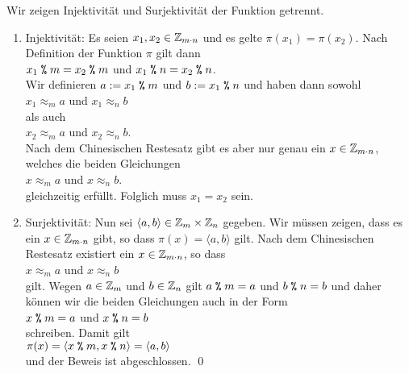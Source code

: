\proof
Wir zeigen Injektivit\"{a}t
und Surjektivit\"{a}t der Funktion getrennt.
\begin{enumerate}
\item Injektivit\"{a}t:  Es seien $x_1,x_2 \in \mathbb{Z}_{m \cdot n}$ und es gelte $\pi(x_1) = \pi(x_2)$.  Nach
      Definition der Funktion $\pi$ gilt dann
      \\[0.2cm]
      \hspace*{1.3cm}
      $x_1 \;\texttt{\%}\; m = x_2 \;\texttt{\%}\; m$ \quad und \quad 
      $x_1 \;\texttt{\%}\; n = x_2 \;\texttt{\%}\; n$.
      \\[0.2cm]
      Wir definieren $a := x_1 \;\texttt{\%}\; m$ und $b := x_1 \;\texttt{\%}\; n$ und haben dann sowohl
      \\[0.2cm]
      \hspace*{1.3cm}
      $x_1 \approx_m a$ \quad und \quad $x_1 \approx_n b$
      \\[0.2cm]
      als auch
      \\[0.2cm]
      \hspace*{1.3cm}
      $x_2 \approx_m a$ \quad und \quad $x_2 \approx_n b$.
      \\[0.2cm]
      Nach dem Chinesischen Restesatz
      gibt es aber nur genau ein $x \in \mathbb{Z}_{m \cdot n}$, welches die beiden Gleichungen
      \\[0.2cm]
      \hspace*{1.3cm}
      $x \approx_m a$ \quad und \quad $x \approx_n b$.
      \\[0.2cm]
      gleichzeitig erf\"{u}llt.  Folglich muss $x_1 = x_2$ sein.
\item Surjektivit\"{a}t: Nun sei $\langle a, b \rangle \in \mathbb{Z}_{m} \times \mathbb{Z}_{n}$ gegeben.  Wir m\"{u}ssen
      zeigen, dass es ein $x \in \mathbb{Z}_{m \cdot n}$ gibt, so dass $\pi(x) = \langle a, b \rangle$
      gilt.  Nach dem Chinesischen Restesatz existiert ein $x \in \mathbb{Z}_{m \cdot n}$, so dass
      \\[-0.2cm]
      \hspace*{1.3cm}
      $x \approx_m a$ \quad und \quad $x \approx_n b$
      \\[0.2cm]
      gilt.  Wegen $a \in \mathbb{Z}_{m}$ und $b \in \mathbb{Z}_{n}$ gilt $a \;\texttt{\%}\; m = a$ und $b \;\texttt{\%}\; n = b$
      und daher k\"{o}nnen wir die beiden Gleichungen auch 
      in der Form
      \\[0.2cm]
      \hspace*{1.3cm}
      $x \;\texttt{\%}\; m = a$ \quad und \quad $x \;\texttt{\%}\; n = b$
      \\[0.2cm]
      schreiben.  Damit gilt
      \\[0.2cm]
      \hspace*{1.3cm}
      $\pi(x) = \langle x \;\texttt{\%}\; m, x \;\texttt{\%}\; n \rangle = \langle a, b \rangle$
      \\[0.2cm]
      und der Beweis ist abgeschlossen.  \qed
\end{enumerate}

